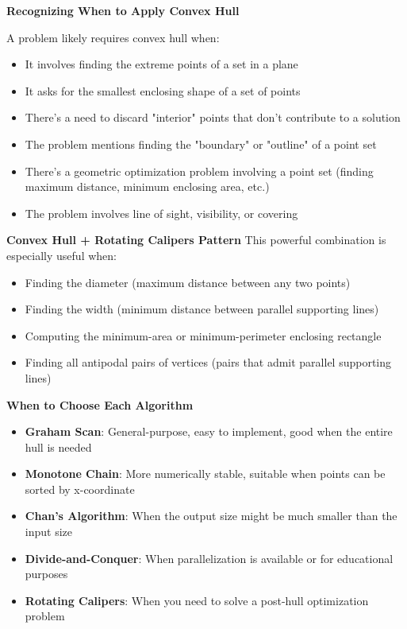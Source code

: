 \begin{pattern}
\textbf{Recognizing When to Apply Convex Hull}

A problem likely requires convex hull when:
\begin{itemize}
    \item It involves finding the extreme points of a set in a plane
    \item It asks for the smallest enclosing shape of a set of points
    \item There's a need to discard "interior" points that don't contribute to a solution
    \item The problem mentions finding the "boundary" or "outline" of a point set
    \item There's a geometric optimization problem involving a point set (finding maximum distance, minimum enclosing area, etc.)
    \item The problem involves line of sight, visibility, or covering
\end{itemize}

\textbf{Convex Hull + Rotating Calipers Pattern}
This powerful combination is especially useful when:
\begin{itemize}
    \item Finding the diameter (maximum distance between any two points)
    \item Finding the width (minimum distance between parallel supporting lines)
    \item Computing the minimum-area or minimum-perimeter enclosing rectangle
    \item Finding all antipodal pairs of vertices (pairs that admit parallel supporting lines)
\end{itemize}

\textbf{When to Choose Each Algorithm}
\begin{itemize}
    \item \textbf{Graham Scan}: General-purpose, easy to implement, good when the entire hull is needed
    \item \textbf{Monotone Chain}: More numerically stable, suitable when points can be sorted by x-coordinate
    \item \textbf{Chan's Algorithm}: When the output size might be much smaller than the input size
    \item \textbf{Divide-and-Conquer}: When parallelization is available or for educational purposes
    \item \textbf{Rotating Calipers}: When you need to solve a post-hull optimization problem
\end{itemize}
\end{pattern}